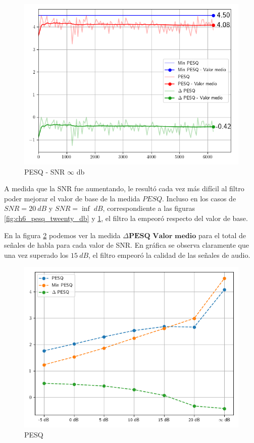 \begin{figure}[H]
	\centering
	\centerline{\includegraphics[scale=0.75]{images/ch6/af/objective_metrics/metric_PESQ_infdb.png}}
	\caption{PESQ - SNR $\infty$ db}
	\label{fig:ch6_pesq_inf_db}
\end{figure}

A medida que la SNR fue aumentando, le resultó cada vez más difícil al filtro poder mejorar el valor de base de la medida $PESQ$. Incluso en los casos de $SNR = \SI{20}{dB}$ y $SNR = \inf \; dB$, correspondiente a las figuras \ref{fig:ch6_pesq_tweenty_db} y \ref{fig:ch6_pesq_inf_db}, el filtro la empeoró respecto del valor de base.

En la figura \ref{fig:ch6_pesq_resume} podemos ver la medida $\Delta \textbf{PESQ Valor medio}$ para el total de señales de habla para cada valor de SNR. En gráfica se observa claramente que una vez superado los $\SI{15}{dB}$, el filtro empeoró la calidad de las señales de audio.

\begin{figure}
	\centering
	\centerline{\includegraphics[scale=0.75]{images/ch6/af/objective_metrics/metric_PESQ.png}}
	\caption{PESQ}
	\label{fig:ch6_pesq_resume}
\end{figure}

